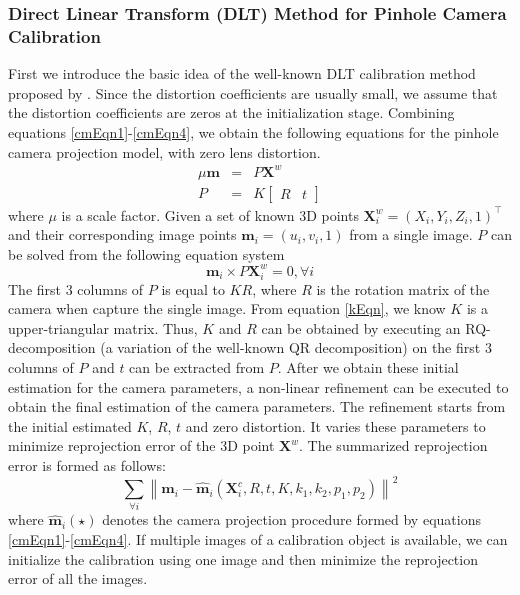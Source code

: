 \documentclass{report}
\begin{document}
\subsubsection{Direct Linear Transform (DLT) Method for Pinhole Camera Calibration}
First we introduce the basic idea of the well-known DLT calibration method proposed by \cite{}. Since the distortion coefficients are usually small, we assume that the distortion coefficients are zeros at the initialization stage. Combining equations \ref{cmEqn1}-\ref{cmEqn4}, we obtain the following equations for the pinhole camera projection model, with zero lens distortion. 
\begin{eqnarray}
\mu \mathbf{m} &=& P \mathbf{X}^w \\
P &=& K 
\begin{bmatrix}
R & t
\end{bmatrix}
\end{eqnarray}
where $\mu$ is a scale factor. Given a set of known 3D points $\mathbf{X}^w_i = (X_i, Y_i, Z_i, 1)^\top$ and their corresponding image points $\mathbf{m}_i = (u_i, v_i, 1)$ from a single image. $P$ can be solved from the following equation system 
\begin{equation}
\mathbf{m}_i \times P \mathbf{X}^w_i= 0, \forall i
\end{equation}
The first 3 columns of $P$ is equal to $K R$, where $R$ is the rotation matrix of the camera when capture the single image. From equation \ref{kEqn}, we know $K$ is a upper-triangular matrix. Thus, $K$ and $R$ can be obtained by executing an RQ-decomposition (a variation of the well-known QR decomposition) on the first 3 columns of $P$ and $t$ can be extracted from $P$. After we obtain these initial estimation for the camera parameters, a non-linear refinement can be executed to obtain the final estimation of the camera parameters. The refinement starts from the initial estimated $K$, $R$, $t$ and zero distortion. It varies these parameters to minimize reprojection error of the 3D point $\mathbf{X}^w$. The summarized reprojection error is formed as follows: 
\begin{equation}
\sum_{\forall i} \left \| \mathbf{m}_i - \hat{\mathbf{m}}_i(\mathbf{X}^c_i, R, t, K, k_1, k_2, p_1, p_2) \right \|^2
\end{equation}
where $\hat{\mathbf{m}}_i(\star)$ denotes the camera projection procedure formed by equations \ref{cmEqn1}-\ref{cmEqn4}. If multiple images of a calibration object is available, we can initialize the calibration using one image and then minimize the reprojection error of all the images. 
\end{document}
